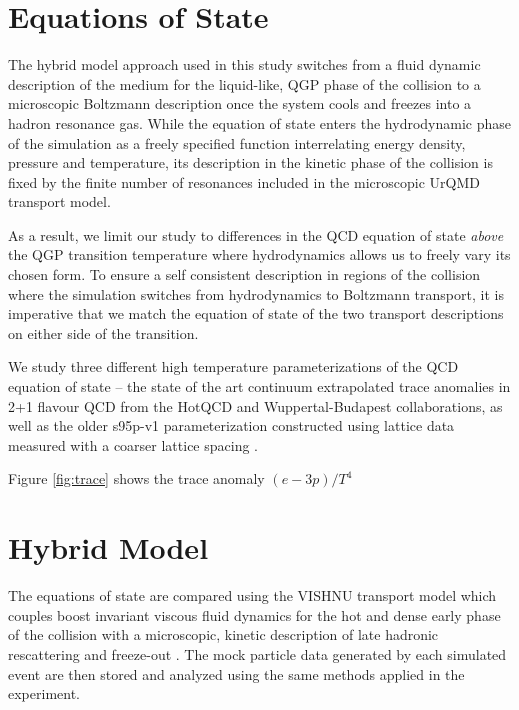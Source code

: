 \documentclass[aps,prc,reprint,amsmath,nofootinbib,superscriptaddress]{revtex4-1}
\begin{document}
\section{Equations of State}

The hybrid model approach used in this study switches from a fluid dynamic description of the medium for the liquid-like, QGP phase of the collision to a microscopic Boltzmann description once the system cools and freezes into a hadron resonance gas. 
While the equation of state enters the hydrodynamic phase of the simulation as a freely specified function interrelating energy density, pressure and temperature, its description in the kinetic phase of the collision is fixed by the finite number of resonances included in the microscopic UrQMD transport model.

As a result, we limit our study to differences in the QCD equation of state \emph{above} the QGP transition temperature where hydrodynamics allows us to freely vary its chosen form. To ensure a self consistent description in regions of the collision where the simulation switches from hydrodynamics to Boltzmann transport, it is imperative that we match the equation of state of the two transport descriptions on either side of the transition.

We study three different high temperature parameterizations of the QCD equation of state -- the state of the art continuum extrapolated trace anomalies in 2+1 flavour QCD from the HotQCD \cite{Bazavov:2014pvz} and Wuppertal-Budapest \cite{Borsanyi:2013bia} collaborations, as well as the older s95p-v1 parameterization \cite{Huovinen:2009yb} constructed using lattice data measured with a coarser lattice spacing \cite{Bazavov:2009zn}.

Figure \ref{fig:trace} shows the trace anomaly $(e - 3 p)/T^4$




\section{Hybrid Model}

The equations of state are compared using the VISHNU transport model which couples boost invariant viscous fluid dynamics \cite{?} for the hot 
and dense early phase of the collision with a microscopic, kinetic description of late hadronic rescattering and freeze-out \cite{?}. The mock 
particle data generated by each simulated event are then stored and analyzed using the same methods applied in the experiment.
\end{document}
